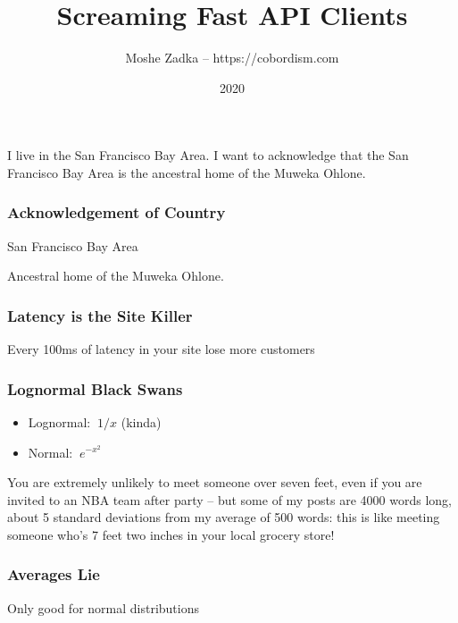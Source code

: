 \usepackage{hyperref}
\usepackage{graphicx}
\usepackage{listings}
\usepackage{textcomp}
\usepackage{fancyvrb}

\title{Screaming Fast API Clients}
\author{Moshe Zadka -- https://cobordism.com}
\date{2020}


\begin{titlepage}
\maketitle
\end{titlepage}

\frame{\titlepage}

I live in the San Francisco Bay Area.
I want to acknowledge that the San Francisco Bay Area
is the ancestral home of the Muweka Ohlone.

\begin{frame}
\frametitle{Acknowledgement of Country}

San Francisco Bay Area

Ancestral home of the Muweka Ohlone.

\end{frame}

\begin{frame}
\frametitle{Latency is the Site Killer}

Every 100ms of latency in your site lose more customers

\end{frame}

\begin{frame}
\frametitle{Lognormal Black Swans}

\begin{itemize}
\item Lognormal: $~1/x$ (kinda)
\item Normal: $~e^{-x^2}$
\end{itemize}

\end{frame}

You are extremely unlikely to meet someone over seven feet,
even if you are invited to an NBA team after party --
but some of my posts are 4000 words long,
about 5 standard deviations from my average of 500 words:
this is like meeting someone who's 7 feet two inches
in your local grocery store!

\begin{frame}
\frametitle{Averages Lie}

Only good for normal distributions

\end{frame}


